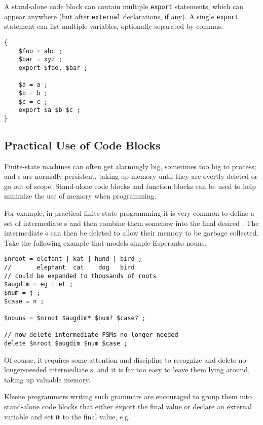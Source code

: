 A stand-alone code block can contain multiple \texttt{export} statements,
which can appear anywhere (but after \texttt{external} declarations, if
any).  A single \texttt{export} statement can list multiple variables,
optionally separated by commas.

\begin{samepage}
\begin{Verbatim}
{
    $foo = abc ;
    $bar = xyz ;
    export $foo, $bar ;

    $a = a ;
    $b = b ;
    $c = c ;
    export $a $b $c ;
}
\end{Verbatim}
\end{samepage}


\subsection{Practical Use of Code Blocks}

\label{sec:codeblock}

Finite-state machines can often get alarmingly big, sometimes too big to
process; and \fsm{}s are normally persistent, taking up memory until
they are overtly deleted or go out of scope.  Stand-alone code blocks and function blocks
can be used to help minimize the use of memory when programming.  

For example, in practical finite-state programming it is very common to
define a set of intermediate \fsm{}s and then combine them somehow into
the final desired \fsm{}.  The intermediate \fsm{}s can then be deleted
to allow their memory to be garbage collected.  Take the following
example that models simple Esperanto nouns.

\begin{Verbatim}
$nroot = elefant | kat | hund | bird ;  
//       elephant  cat    dog   bird
// could be expanded to thousands of roots
$augdim = eg | et ;
$num = j ;
$case = n ;

$nouns = $nroot $augdim* $num? $case? ;

// now delete intermediate FSMs no longer needed
delete $nroot $augdim $num $case ;
\end{Verbatim}

\noindent
Of course, it requires some attention and discipline
to recognize and delete no-longer-needed intermediate \fsm{}s,
and it is far too easy to leave them lying around, taking up valuable memory.  

Kleene programmers writing such grammars are encouraged to group them into stand-alone 
code blocks that
either export the final value or declare an external variable and set it to the final
value, e.g.

